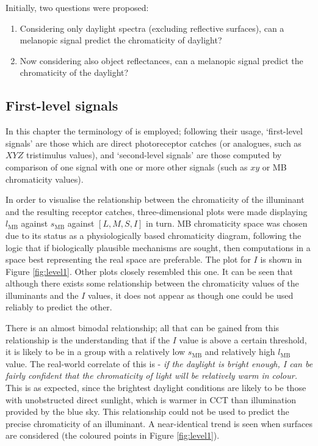 \bigskip
\noindent
Initially, two questions were proposed:
\begin{enumerate}
\item Considering only daylight spectra (excluding reflective surfaces), can a melanopic signal predict the chromaticity of daylight? \item Now considering also object reflectances, can a melanopic signal predict the chromaticity of the daylight? 
\end{enumerate}

\subsection{First-level signals}

In this chapter the terminology of \citet{barrionuevo_contributions_2014} is employed; following their usage, `first-level signals' are those which are direct photoreceptor catches (or analogues, such as $XYZ$ tristimulus values), and `second-level signals' are those computed by comparison of one signal with one or more other signals (such as $xy$ or \gls{MB} chromaticity values).

In order to visualise the relationship between the chromaticity of the illuminant and the resulting receptor catches, three-dimensional plots were made displaying $l_{\text{MB}}$ against $s_{\text{MB}}$ against $[L,M,S,I]$ in turn. \gls{MB} chromaticity space was chosen due to its status as a physiologically based chromaticity diagram, following the logic that if biologically plausible mechanisms are sought, then computations in a space best representing the real space are preferable. The plot for $I$ is shown in Figure \ref{fig:level1}. Other plots closely resembled this one. It can be seen that although there exists some relationship between the chromaticity values of the illuminants and the $I$ values, it does not appear as though one could be used reliably to predict the other. 

There is an almost bimodal relationship; all that can be gained from this relationship is the understanding that if the $I$ value is above a certain threshold, it is likely to be in a group with a relatively low $s_{\text{MB}}$ and relatively high $l_{\text{MB}}$ value. The real-world correlate of this is - \textit{if the daylight is bright enough, I can be fairly confident that the chromaticity of light will be relatively warm in colour.} This is as expected, since the brightest daylight conditions are likely to be those with unobstructed direct sunlight, which is warmer in \gls{CCT} than illumination provided by the blue sky. This relationship could not be used to predict the precise chromaticity of an illuminant. A near-identical trend is seen when surfaces are considered (the coloured points in Figure \ref{fig:level1}).

